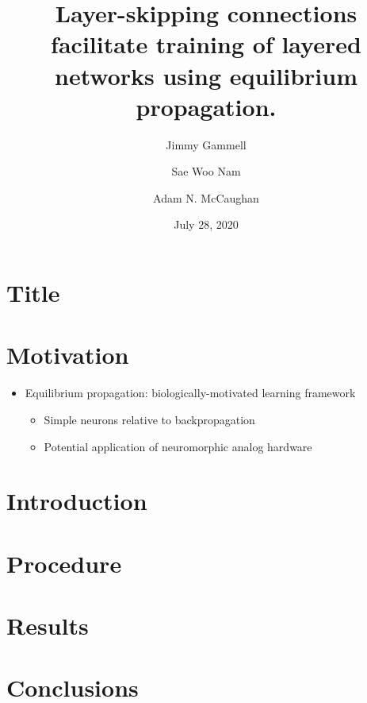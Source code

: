 \documentclass[pdf]{beamer}
\title{Layer-skipping connections facilitate training of layered networks using equilibrium propagation.}
\author{Jimmy Gammell \and Sae Woo Nam \and Adam N. McCaughan}
\date{July 28, 2020}
\begin{document}
\section{Title} %
\begin{frame} %
	\titlepage
\end{frame}

\section{Motivation} %
\begin{frame}
	\begin{itemize}
		\item<1-> Equilibrium propagation\autocite{scellier17}: biologically-motivated learning framework
		\begin{itemize}
			\item<2-> Simple neurons relative to backpropagation
			\item<3-> Potential application of neuromorphic analog hardware
		\end{itemize}
	\end{itemize}

\end{frame}

\section{Introduction} %

\section{Procedure} %

\section{Results} %

\section{Conclusions} %
\end{document}
